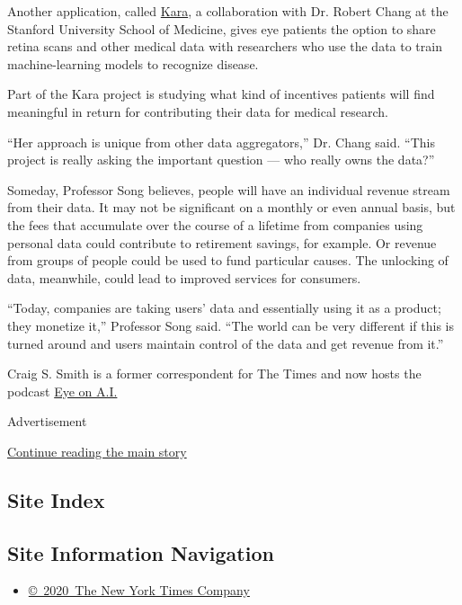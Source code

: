 Another application, called \href{https://kara.cloud/\#/}{Kara}, a
collaboration with Dr. Robert Chang at the Stanford University School of
Medicine, gives eye patients the option to share retina scans and other
medical data with researchers who use the data to train machine-learning
models to recognize disease.

Part of the Kara project is studying what kind of incentives patients
will find meaningful in return for contributing their data for medical
research.

``Her approach is unique from other data aggregators,'' Dr. Chang said.
``This project is really asking the important question --- who really
owns the data?''

Someday, Professor Song believes, people will have an individual revenue
stream from their data. It may not be significant on a monthly or even
annual basis, but the fees that accumulate over the course of a lifetime
from companies using personal data could contribute to retirement
savings, for example. Or revenue from groups of people could be used to
fund particular causes. The unlocking of data, meanwhile, could lead to
improved services for consumers.

``Today, companies are taking users' data and essentially using it as a
product; they monetize it,'' Professor Song said. ``The world can be
very different if this is turned around and users maintain control of
the data and get revenue from it.''

Craig S. Smith is a former correspondent for The Times and now hosts the
podcast \href{https://www.eye-on.ai}{Eye on A.I.}

Advertisement

\protect\hyperlink{after-bottom}{Continue reading the main story}

\hypertarget{site-index}{%
\subsection{Site Index}\label{site-index}}

\hypertarget{site-information-navigation}{%
\subsection{Site Information
Navigation}\label{site-information-navigation}}

\begin{itemize}
\tightlist
\item
  \href{https://help.nytimes3xbfgragh.onion/hc/en-us/articles/115014792127-Copyright-notice}{©~2020~The
  New York Times Company}
\end{itemize}

